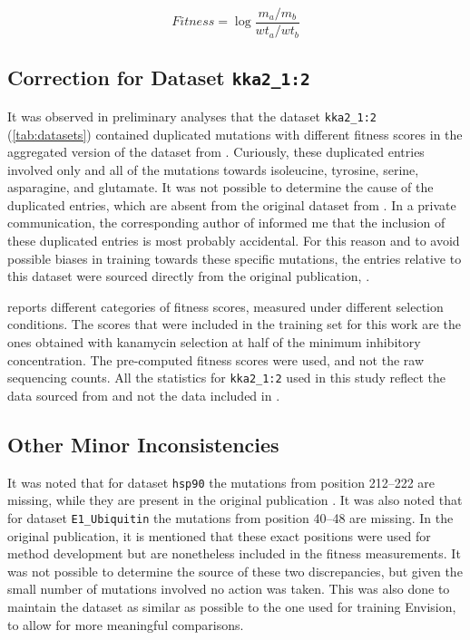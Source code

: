 \begin{equation}\label{eq:fitness}
	Fitness = \log{\frac{m_a/m_b}{wt_a/wt_b}}
\end{equation}

\subsection{Correction for Dataset \texttt{kka2\_1:2}}
It was observed in preliminary analyses that the dataset \texttt{kka2\_1:2} (\cref{tab:datasets}) contained duplicated mutations with different fitness scores in the aggregated version of the dataset from \textcite{Gray2018}.
Curiously, these duplicated entries involved only and all of the mutations towards isoleucine, tyrosine, serine, asparagine, and glutamate.
It was not possible to determine the cause of the duplicated entries, which are absent from the original dataset from \textcite{Melnikov2014}.
In a private communication, the corresponding author of \textcite{Gray2018} informed me that the inclusion of these duplicated entries is most probably accidental.
For this reason and to avoid possible biases in training towards these specific mutations, the entries relative to this dataset were sourced directly from the original publication, \textcite{Melnikov2014}.

\textcite{Melnikov2014} reports different categories of fitness scores, measured under different selection conditions.
The scores that were included in the training set for this work are the ones obtained with kanamycin selection at half of the minimum inhibitory concentration.
The pre-computed fitness scores were used, and not the raw sequencing counts.
All the statistics for \texttt{kka2\_1:2} used in this study reflect the data sourced from \textcite{Melnikov2014} and not the data included in \textcite{Gray2018}.

\subsection{Other Minor Inconsistencies}\label{sec:minor_inconsistencies}
It was noted that for dataset \texttt{hsp90} the mutations from position \numrange{212}{222} are missing, while they are present in the original publication \parencite{Mishra2016}.
It was also noted that for dataset \texttt{E1\_Ubiquitin} the mutations from position \numrange{40}{48} are missing.
In the original publication, it is mentioned that these exact positions were used for method development but are nonetheless included in the fitness measurements.
It was not possible to determine the source of these two discrepancies, but given the small number of mutations involved no action was taken.
This was also done to maintain the dataset as similar as possible to the one used for training Envision, to allow for more meaningful comparisons.

